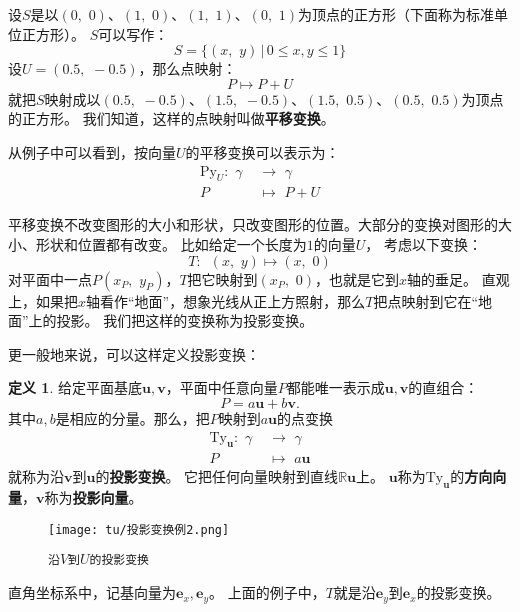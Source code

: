 \documentclass[12pt,UTF8]{ctexbook}
\theoremstyle{definition}
\newtheorem{df}{定义}[section]
\theoremstyle{plain}
\begin{document}
设$S$是以$(0,\,\,0)$、$(1,\,\,0)$、$(1,\,\,1)$、$(0,\,\,1)$为顶点的正方形（下面称为标准单位正方形）。
$S$可以写作：
$$ S = \{ (x,\,\, y) \, | \, 0\leqslant x, y \leqslant 1\} $$
设$U = (0.5, \,\, -0.5)$，那么点映射：
$$ P \mapsto P + U $$
就把$S$映射成以$(0.5,\,\,-0.5)$、$(1.5,\,\,-0.5)$、$(1.5,\,\,0.5)$、$(0.5,\,\,0.5)$为顶点的正方形。
我们知道，这样的点映射叫做\textbf{平移变换}。

从例子中可以看到，按向量$U$的平移变换可以表示为：
\begin{align*}
    \mathrm{Py}_U : \,\, \gamma\,\,&\rightarrow \,\, \gamma  \\
    P &\mapsto \,\, P + U 
\end{align*}

平移变换不改变图形的大小和形状，只改变图形的位置。大部分的变换对图形的大小、形状和位置都有改变。
比如给定一个长度为$1$的向量$U$，
考虑以下变换：
$$ T: \,\,\, (x, \,\, y) \mapsto (x,\,\, 0)$$
对平面中一点$P(x_P, \,\, y_P)$，$T$把它映射到$(x_P,\,\,0)$，也就是它到$x$轴的垂足。
直观上，如果把$x$轴看作“地面”，想象光线从正上方照射，那么$T$把点映射到它在“地面”上的投影。
我们把这样的变换称为投影变换。

更一般地来说，可以这样定义投影变换：
\begin{df}
    给定平面基底$\mathbf{u}, \mathbf{v}$，平面中任意向量$P$都能唯一表示成$\mathbf{u}, \mathbf{v}$的直组合：
    $$ P = a\mathbf{u} + b\mathbf{v}.$$
    其中$a, b$是相应的分量。那么，把$P$映射到$a\mathbf{u}$的点变换
    \begin{align*}
        \mathrm{Ty}_\mathbf{u} : \,\, \gamma\,\,&\rightarrow \,\, \gamma  \\
        P &\mapsto \,\, a\mathbf{u} 
    \end{align*}
    就称为沿$\mathbf{v}$到$\mathbf{u}$的\textbf{投影变换}。
    它把任何向量映射到直线$\mathbb{R}\mathbf{u}$上。
    $\mathbf{u}$称为$\mathrm{Ty}_\mathbf{u}$的\textbf{方向向量}，$\mathbf{v}$称为\textbf{投影向量}。
\end{df}

\begin{wrapfigure}[9]{r}{0.38\textwidth} %
    \vspace{-20pt}
    \flushright
    \texttt{[image: tu/投影变换例2.png]}
    \caption*{\texttt{沿}$V$\texttt{到}$U$\texttt{的投影变换}}
\end{wrapfigure}

直角坐标系中，记基向量为$\mathbf{e}_x, \mathbf{e}_y$。 
上面的例子中，$T$就是沿$\mathbf{e}_y$到$\mathbf{e}_x$的投影变换。
\end{document}
